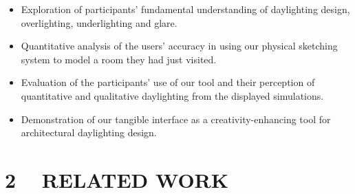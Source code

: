 \documentclass{article}
\begin{document}
\begin{itemize}

\item Exploration of participants' fundamental understanding of
  daylighting design, overlighting, underlighting and glare.

\item Quantitative analysis of the users' accuracy in using our
  physical sketching system to model a room they had just visited.

\item Evaluation of the participants' use of our tool and their
  perception of quantitative and qualitative daylighting from the 
  displayed simulations.

\item Demonstration of our tangible interface as a
  creativity-enhancing tool for architectural daylighting design.

\end{itemize}














\section{2 ~ RELATED WORK}


\end{document}
